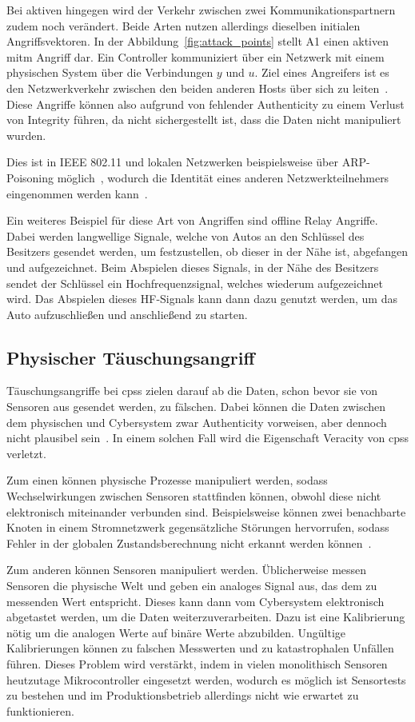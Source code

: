 \documentclass[final,bibliography=totocnumbered]{include/sikseminar}
\newcommand{\cps}{\glspl{cps}\xspace}
\begin{document}
Bei aktiven hingegen wird der Verkehr zwischen zwei Kommunikationspartnern zudem noch verändert.
Beide Arten nutzen allerdings dieselben initialen Angriffsvektoren.
In der Abbildung~\ref{fig:attack_points} stellt A1 einen aktiven \gls{mitm} Angriff dar.
Ein Controller kommuniziert über ein Netzwerk mit einem physischen System über die Verbindungen $y$ und $u$.
Ziel eines Angreifers ist es den Netzwerkverkehr zwischen den beiden anderen Hosts über sich zu leiten~\cite{WYX+10,FPA+18}.
Diese Angriffe können also aufgrund von fehlender Authenticity zu einem Verlust von Integrity führen, da nicht sichergestellt ist, dass die Daten nicht manipuliert wurden.

Dies ist in IEEE 802.11 und lokalen Netzwerken beispielsweise über ARP-Poisoning möglich~\cite{FIT+12}, wodurch die Identität eines anderen Netzwerkteilnehmers eingenommen werden kann~\cite{RN05}.

Ein weiteres Beispiel für diese Art von Angriffen sind offline Relay Angriffe.
Dabei werden langwellige Signale, welche von Autos an den Schlüssel des Besitzers gesendet werden, um festzustellen, ob dieser in der Nähe ist, abgefangen und aufgezeichnet.
Beim Abspielen dieses Signals, in der Nähe des Besitzers sendet der Schlüssel ein Hochfrequenzsignal, welches wiederum aufgezeichnet wird.
Das Abspielen dieses HF-Signals kann dann dazu genutzt werden, um das Auto aufzuschließen und anschließend zu starten.~\cite{HLL+17}

\subsection{Physischer Täuschungsangriff}\label{subsec:physical-deception}
Täuschungsangriffe bei \cps zielen darauf ab die Daten, schon bevor sie von Sensoren aus gesendet werden, zu fälschen.
Dabei können die Daten zwischen dem physischen und Cybersystem zwar Authenticity vorweisen, aber dennoch nicht plausibel sein~\cite{SFJ17}.
In einem solchen Fall wird die Eigenschaft Veracity von \cps verletzt.

Zum einen können physische Prozesse manipuliert werden, sodass Wechselwirkungen zwischen Sensoren stattfinden können, obwohl diese nicht elektronisch miteinander verbunden sind.
Beispielsweise können zwei benachbarte Knoten in einem Stromnetzwerk gegensätzliche Störungen hervorrufen, sodass Fehler in der globalen Zustandsberechnung nicht erkannt werden können~\cite{KLG15}.

Zum anderen können Sensoren manipuliert werden.
Üblicherweise messen Sensoren die physische Welt und geben ein analoges Signal aus, das dem zu messenden Wert entspricht.
Dieses kann dann vom Cybersystem elektronisch abgetastet werden, um die Daten weiterzuverarbeiten.
Dazu ist eine Kalibrierung nötig um die analogen Werte auf binäre Werte abzubilden.
Ungültige Kalibrierungen können zu falschen Messwerten und zu katastrophalen Unfällen führen.
Dieses Problem wird verstärkt, indem in vielen monolithisch Sensoren heutzutage Mikrocontroller eingesetzt werden, wodurch es möglich ist Sensortests zu bestehen und im Produktionsbetrieb allerdings nicht wie erwartet zu funktionieren.~\cite{KLG15}
\end{document}
